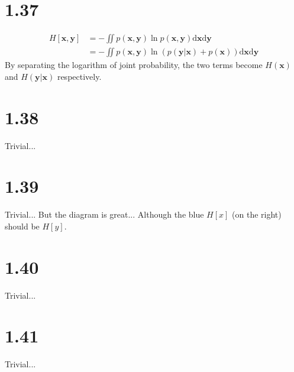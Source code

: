 \documentclass[12pt]{article}
\newcommand{\vect}[1]{\mathbf{#1}}
\begin{document}
\section{1.37}
\begin{align}
H[\vect{x}, \vect{y} ] & = - \iint p(\vect{x},\vect{y}) \ln p(\vect{x}, \vect{y}) \mathrm{d} \vect{x} \mathrm{d} \vect{y}  \\
& = - \iint p(\vect{x},\vect{y}) \ln (p(\vect{y} | \vect{x})+p(\vect{x})) \mathrm{d} \vect{x} \mathrm{d} \vect{y} 
\end{align}
By separating the logarithm of joint probability, the two terms become $H(\vect{x})$ and $H(\vect{y}|\vect{x})$ respectively.

\section{1.38}
Trivial...


\section{1.39}
Trivial... But the diagram is great... Although the blue $H[x]$ (on the right) should be $H[y]$.

\section{1.40}
Trivial...

\section{1.41}
Trivial...
\end{document}
